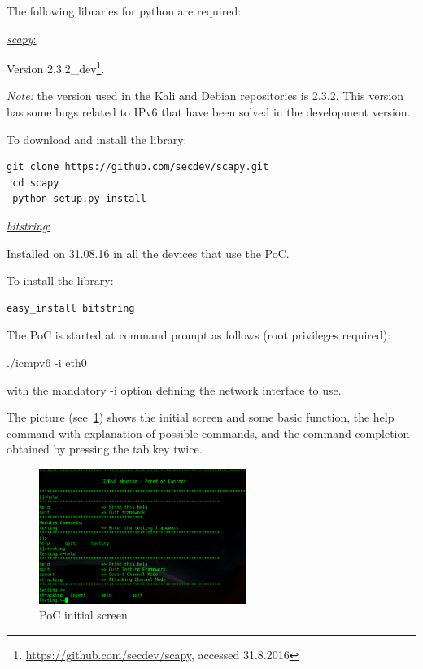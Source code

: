 \documentclass[12pt]{article}
\begin{document}
The following libraries for python are required:

\vspace{-5pt}
\underline{\textit{scapy}:}

Version 2.3.2_dev\footnote{\url{https://github.com/secdev/scapy}, accessed 31.8.2016}.

\textit{Note:} the version used in the Kali and Debian repositories is 2.3.2. This version has some bugs related to IPv6 that have been solved in the development version.

To download and install the library:
\begin{lstlisting}[style=python,basicstyle=\ttfamily\footnotesize]
 git clone https://github.com/secdev/scapy.git
 cd scapy
 python setup.py install
\end{lstlisting}

\underline{\textit{bitstring}:}

Installed on 31.08.16 in all the devices that use the PoC.

To install the library:
\begin{lstlisting}[style=python,basicstyle=\ttfamily\footnotesize]
 easy_install bitstring
\end{lstlisting}

The PoC is started at command prompt as follows (root privileges required):

./icmpv6 -i eth0

with the mandatory -i option defining the network interface to use.

The picture (see~\cref{fig:pocMain}) shows the initial screen and some basic function, the help command with explanation of possible commands, and the command completion obtained by pressing the tab key twice.

\begin{figure}[ht] 
\begin{center}
\includegraphics[width=0.6\textwidth]{pocMain}
\caption{PoC initial screen}
\label{fig:pocMain}
\end{center}
\end{figure}
\end{document}
